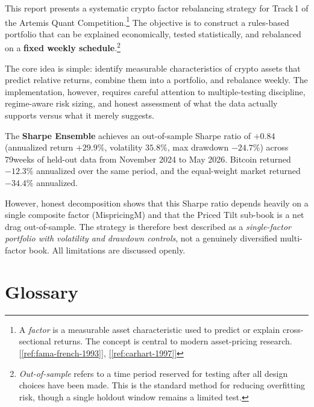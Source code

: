 \documentclass[11pt,a4paper]{article}
\newcommand{\ieeecitetwo}[2]{\hyperref[ref:#1]{[\ref*{ref:#1}]}, \hyperref[ref:#2]{[\ref*{ref:#2}]}}
\begin{document}
This report presents a systematic crypto factor rebalancing strategy for Track\,1 of the Artemis Quant Competition.\footnote{A \emph{factor} is a measurable asset characteristic used to predict or explain cross-sectional returns. The concept is central to modern asset-pricing research.\ieeecitetwo{fama-french-1993}{carhart-1997}} The objective is to construct a rules-based portfolio that can be explained economically, tested statistically, and rebalanced on a \textbf{fixed weekly schedule}.\footnote{\emph{Out-of-sample} refers to a time period reserved for testing after all design choices have been made. This is the standard method for reducing overfitting risk, though a single holdout window remains a limited test.}

The core idea is simple: identify measurable characteristics of crypto assets that predict relative returns, combine them into a portfolio, and rebalance weekly. The implementation, however, requires careful attention to multiple-testing discipline, regime-aware risk sizing, and honest assessment of what the data actually supports versus what it merely suggests.

\begin{keyfinding}[title=Headline Result]
The \textbf{Sharpe Ensemble} achieves an out-of-sample Sharpe ratio of $+0.84$ (annualized return $+29.9\%$, volatility $35.8\%$, max drawdown $-24.7\%$) across 79\;weeks of held-out data from November 2024 to May 2026. Bitcoin returned $-12.3\%$ annualized over the same period, and the equal-weight market returned $-34.4\%$ annualized.
\end{keyfinding}

However, honest decomposition shows that this Sharpe ratio depends heavily on a single composite factor (MispricingM) and that the Priced Tilt sub-book is a net drag out-of-sample. The strategy is therefore best described as a \emph{single-factor portfolio with volatility and drawdown controls}, not a genuinely diversified multi-factor book. All limitations are discussed openly.

\section{Glossary}
\end{document}

